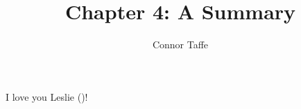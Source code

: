 \documentclass[man,11pt,a4paper,biblatex]{apa6}
\title{Chapter 4: A Summary}
\affiliation{University of Arkansas at Little Rock}
\author{Connor Taffe}
\begin{document}
  \maketitle

  I love you Leslie (\cite{lamport94})!

  \printbibliography
\end{document}
